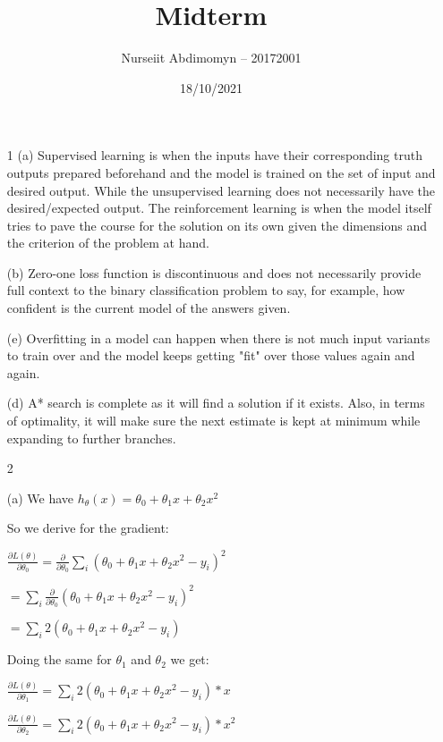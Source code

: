 \documentclass[12pt]{article}
\title{Midterm}
\author{Nurseiit Abdimomyn -- 20172001}
\date{18/10/2021}
\begin{document}
\maketitle

\begin{enumerate}
  \item[1]
  (a) Supervised learning is when the inputs have their corresponding
  truth outputs prepared beforehand and the model is trained on the set of
  input and desired output. While the unsupervised learning does not necessarily
  have the desired/expected output. The reinforcement learning is when the
  model itself tries to pave the course for the solution on its own given
  the dimensions and the criterion of the problem at hand.

  (b) Zero-one loss function is discontinuous and does not necessarily provide full
  context to the binary classification problem to say, for example, how confident is 
  the current model of the answers given.

  (e) Overfitting in a model can happen when there is not much input variants
  to train over and the model keeps getting "fit" over those values again and again.
  
  (d) A* search is complete as it will find a solution if it exists. Also, in terms of optimality,
  it will make sure the next estimate is kept at minimum while expanding to further branches.

  \item[2]

  (a) We have $h_\theta(x) = \theta_0 + \theta_1 x + \theta_2 x^2$

  So we derive for the gradient:

  $\frac{\partial L(\theta)}{\partial \theta_0} = 
  \frac{\partial}{\partial \theta_0} \sum\limits_{i} (\theta_0 + \theta_1 x + \theta_2 x^2 - y_i)^2$

  $= \sum\limits_{i} \frac{\partial}{\partial \theta_0} (\theta_0 + \theta_1 x + \theta_2 x^2 - y_i)^2$
  
  $= \sum\limits_{i} 2 (\theta_0 + \theta_1 x + \theta_2 x^2 - y_i)$

  Doing the same for $\theta_1$ and $\theta_2$ we get:

  $\frac{\partial L(\theta)}{\partial \theta_1} = \sum\limits_{i} 2 (\theta_0 + \theta_1 x + \theta_2 x^2 - y_i) * x$
  
  $\frac{\partial L(\theta)}{\partial \theta_2} = \sum\limits_{i} 2 (\theta_0 + \theta_1 x + \theta_2 x^2 - y_i) * x^2$


\end{enumerate}
\end{document}
